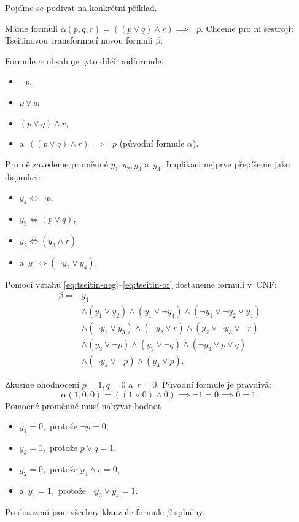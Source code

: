 Pojďme se podívat na konkrétní příklad.
\begin{example}
    Máme formuli $\alpha(p,q,r)=((p\lor q)\land r)\implies \neg p$. Chceme pro ni sestrojit Tseitinovou transformací novou formuli $\beta$.
    
    Formule $\alpha$ obsahuje tyto dílčí podformule:
    \begin{itemize}
        \item $\neg p$,
        \item $p\lor q$,
        \item $(p\lor q)\land r$,
        \item a~$((p\lor q)\land r)\implies \neg p$ (původní formule $\alpha$).
    \end{itemize}
    Pro ně zavedeme proměnné $y_1,y_2,y_3$ a~$y_4$. Implikaci nejprve přepíšeme jako disjunkci:
    \begin{itemize}
        \item $y_4\iff\neg p$,
        \item $y_3\iff(p\lor q)$,
        \item $y_2\iff(y_3\land r)$
        \item a~$y_1\iff(\neg y_2\lor y_4)$.
    \end{itemize}
    Pomocí vztahů \eqref{eq:tseitin-neg}--\eqref{eq:tseitin-or} dostaneme formuli v~CNF:
    \begin{align*}
        \beta={}&y_1\\
        &\land(y_1\lor y_2)\land(y_1\lor\neg y_4)
            \land(\neg y_1\lor\neg y_2\lor y_4)\\
        &\land(\neg y_2\lor y_3)\land(\neg y_2\lor r)
            \land(y_2\lor\neg y_3\lor\neg r)\\
        &\land(y_3\lor\neg p)\land(y_3\lor\neg q)
            \land(\neg y_3\lor p\lor q)\\
        &\land(\neg y_4\lor\neg p)\land(y_4\lor p).
    \end{align*}

    Zkusme ohodnocení $p=1,q=0$ a~$r=0$. Původní formule je pravdivá:
    \[\alpha(1,0,0)=((1\lor 0)\land 0)\implies\neg 1=0\implies 0=1.\]
    Pomocné proměnné musí nabývat hodnot
    \begin{itemize}
        \item $y_4=0$,~protože $\neg p=0$,
        \item $y_3=1$,~protože $p\lor q=1$,
        \item $y_2=0$,~protože $y_3\land r=0$,
        \item a~$y_1=1$,~protože $\neg y_2\lor y_4=1$.
    \end{itemize}
    Po dosazení jsou všechny klauzule formule $\beta$ splněny.
\end{example}

